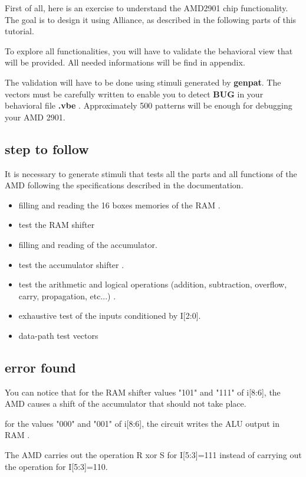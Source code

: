 \documentclass[12pt]{article}
\begin{document}
{First of all, here is an exercise to understand the AMD2901
chip functionality. The goal is to design it 
using Alliance, as described in the following parts of
this tutorial.

To explore all functionalities, you will have
to validate the behavioral view that will be provided. 
All needed informations will be find in appendix.

The validation will have to be done using stimuli 
generated by {\bf genpat}. The vectors must be carefully written
to enable you to detect { \bf BUG } in your behavioral file { \bf .vbe }. 
Approximately 500 patterns will be enough for debugging your AMD 2901.

\subsection{step to follow}
It is necessary to generate stimuli that tests all the parts and all functions
of the AMD following the specifications described in the documentation.

\begin{itemize}\itemsep=-.8ex
\item   filling and reading the 16 boxes memories of the RAM .
\item   test the RAM shifter
\item   filling and reading of the accumulator.
\item   test the accumulator shifter .
\item   test the arithmetic and logical operations
        (addition, subtraction, overflow, carry, propagation, etc...) .
\item   exhaustive test of the inputs conditioned by I[2:0].
\item   data-path test vectors
\end{itemize}

\subsection{error found}

You can notice that for the RAM shifter values "101" and "111" of
i[8:6], the AMD causes a shift of the accumulator that should not
take place.

for the values "000" and "001" of i[8:6], the circuit writes the
ALU output in RAM .

The AMD carries out the operation R xor S for
I[5:3]=111 instead of carrying out the operation for I[5:3]=110.

}
\end{document}
